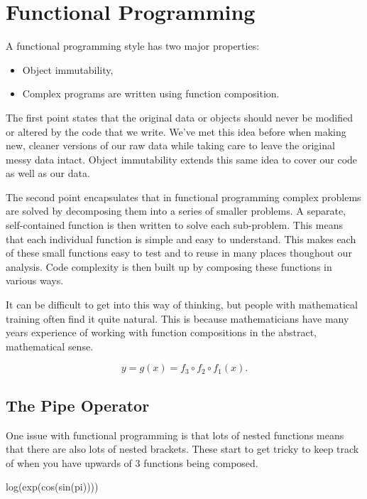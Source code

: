 \documentclass[
  letterpaper,
  DIV=11,
  numbers=noendperiod]{scrreprt}
\newenvironment{Shaded}{\begin{snugshade}}{\end{snugshade}}
\newcommand{\FunctionTok}[1]{\textcolor[rgb]{0.28,0.35,0.67}{#1}}
\newcommand{\NormalTok}[1]{\textcolor[rgb]{0.00,0.23,0.31}{#1}}
\begin{document}
\section{Functional Programming}\label{functional-programming}

A functional programming style has two major properties:

\begin{itemize}
\item
  Object immutability,
\item
  Complex programs are written using function composition.
\end{itemize}

The first point states that the original data or objects should never be
modified or altered by the code that we write. We've met this idea
before when making new, cleaner versions of our raw data while taking
care to leave the original messy data intact. Object immutability
extends this same idea to cover our code as well as our data.

The second point encapsulates that in functional programming complex
problems are solved by decomposing them into a series of smaller
problems. A separate, self-contained function is then written to solve
each sub-problem. This means that each individual function is simple and
easy to understand. This makes each of these small functions easy to
test and to reuse in many places thoughout our analysis. Code complexity
is then built up by composing these functions in various ways.

It can be difficult to get into this way of thinking, but people with
mathematical training often find it quite natural. This is because
mathematicians have many years experience of working with function
compositions in the abstract, mathematical sense.

\[y = g(x) = f_3 \circ f_2 \circ f_1(x).\]

\subsection{The Pipe Operator}\label{the-pipe-operator}

One issue with functional programming is that lots of nested functions
means that there are also lots of nested brackets. These start to get
tricky to keep track of when you have upwards of 3 functions being
composed.

\begin{Shaded}
\begin{Highlighting}[]
\FunctionTok{log}\NormalTok{(}\FunctionTok{exp}\NormalTok{(}\FunctionTok{cos}\NormalTok{(}\FunctionTok{sin}\NormalTok{(pi))))}
\end{Highlighting}
\end{Shaded}
\end{document}

